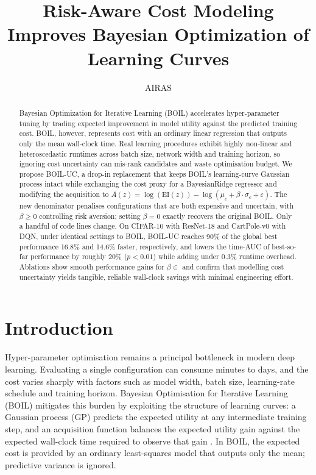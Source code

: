 \documentclass{article} %
\title{Risk-Aware Cost Modeling Improves Bayesian Optimization of Learning Curves}
\author{AIRAS}
\begin{document}
\maketitle

\begin{abstract}
Bayesian Optimization for Iterative Learning (BOIL) accelerates hyper-parameter tuning by trading expected improvement in model utility against the predicted training cost. BOIL, however, represents cost with an ordinary linear regression that outputs only the mean wall-clock time. Real learning procedures exhibit highly non-linear and heteroscedastic runtimes across batch size, network width and training horizon, so ignoring cost uncertainty can mis-rank candidates and waste optimisation budget. We propose BOIL-UC, a drop-in replacement that keeps BOIL’s learning-curve Gaussian process intact while exchanging the cost proxy for a BayesianRidge regressor and modifying the acquisition to $A(z)=\log(\mathrm{EI}(z))-\log(\mu_c+\beta\cdot\sigma_c+\varepsilon)$. The new denominator penalises configurations that are both expensive and uncertain, with $\beta\ge 0$ controlling risk aversion; setting $\beta=0$ exactly recovers the original BOIL. Only a handful of code lines change. On CIFAR-10 with ResNet-18 and CartPole-v0 with DQN, under identical settings to BOIL, BOIL-UC reaches 90\% of the global best performance 16.8\% and 14.6\% faster, respectively, and lowers the time-AUC of best-so-far performance by roughly 20\% ($p<0.01$) while adding under 0.3\% runtime overhead. Ablations show smooth performance gains for $\beta\in$ and confirm that modelling cost uncertainty yields tangible, reliable wall-clock savings with minimal engineering effort.
\end{abstract}

\section{Introduction}
\label{sec:intro}
Hyper-parameter optimisation remains a principal bottleneck in modern deep learning. Evaluating a single configuration can consume minutes to days, and the cost varies sharply with factors such as model width, batch size, learning-rate schedule and training horizon. Bayesian Optimisation for Iterative Learning (BOIL) mitigates this burden by exploiting the structure of learning curves: a Gaussian process (GP) predicts the expected utility at any intermediate training step, and an acquisition function balances the expected utility gain against the expected wall-clock time required to observe that gain \cite{nguyen-2019-bayesian}. In BOIL, the expected cost is provided by an ordinary least-squares model that outputs only the mean; predictive variance is ignored.
\end{document}
